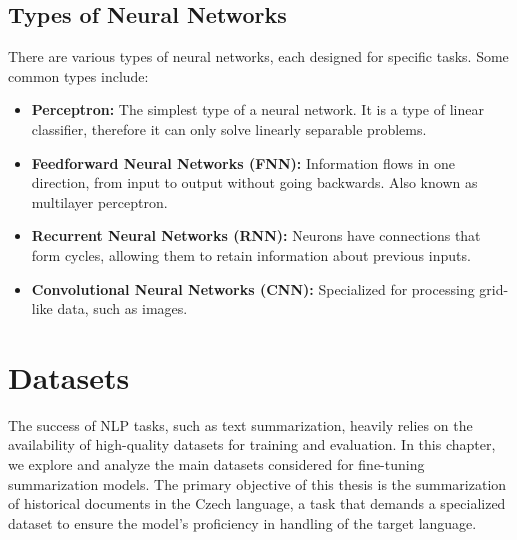 \documentclass[english, ba, kiv, he, iso690numb, pdf, viewonly]{fasthesis}
\begin{document}
\section{Types of Neural Networks}

There are various types of neural networks, each designed for specific tasks. Some common types include:

\begin{itemize}
    \item \textbf{Perceptron:} The simplest type of a neural network. It is a type of linear classifier, therefore it can only solve linearly separable problems.

    \item \textbf{Feedforward Neural Networks (FNN):} Information flows in one direction, from input to output without going backwards. Also known as multilayer perceptron.
    
    \item \textbf{Recurrent Neural Networks (RNN):} Neurons have connections that form cycles, allowing them to retain information about previous inputs.
    
    \item \textbf{Convolutional Neural Networks (CNN):} Specialized for processing grid-like data, such as images.
\end{itemize}
%
%
%
%
\chapter{Datasets} \label{datasets}
The success of NLP tasks, such as text summarization, heavily relies on the availability of high-quality datasets for training and evaluation. In this chapter, we explore and analyze the main datasets considered for fine-tuning summarization models. The primary objective of this thesis is the summarization of historical documents in the Czech language, a task that demands a specialized dataset to ensure the model's proficiency in handling of the target language.
\end{document}
